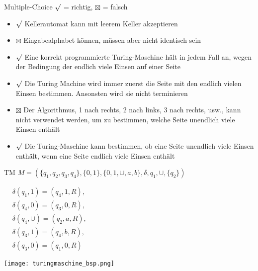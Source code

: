 \begin{example2}{Multiple-Choice} $\surd$ = richtig, $\boxtimes$ = falsch
    \begin{itemize}
        \item $\surd$ Kellerautomat kann mit leerem Keller akzeptieren
        \item $\boxtimes$ Eingabealphabet können, müssen aber nicht identisch sein 
        \item $\surd$ Eine korrekt programmierte Turing-Maschine hält in jedem Fall an, wegen der Bedingung der endlich viele Einsen auf einer Seite
        \item $\surd$ Die Turing Machine wird immer zuerst die Seite mit den endlich vielen Einsen bestimmen. Ansonsten wird sie nicht terminieren
        \item $\boxtimes$ Der Algorithmus, 1 nach rechts, 2 nach links, 3 nach rechts, usw., kann nicht verwendet werden, um zu bestimmen, welche Seite unendlich viele Einsen enthält
        \item $\surd$ Die Turing-Maschine kann bestimmen, ob eine Seite unendlich viele Einsen enthält, wenn eine Seite endlich viele Einsen enthält
    \end{itemize}
\end{example2}


\begin{example2}
    {TM} $M=(\{q_1, q_2, q_3, q_4\},\{0,1\},\{0,1, \cup, a, b\}, \delta, q_1, \cup,\{q_2\})$ 
    
    \begin{minipage}{0.35\linewidth}
    $
    \begin{aligned}
    & \delta(q_1, 1)=(q_4, 1, R), \\
    & \delta(q_4, 0)=(q_3, 0, R), \\
    & \delta(q_4, \cup)=(q_2, a, R), \\
    & \delta(q_3, 1)=(q_4, b, R), \\
    & \delta(q_3, 0)=(q_1, 0, R)
    \end{aligned}
    $
\end{minipage}
\begin{minipage}{0.6\linewidth}
    \texttt{[image: turingmaschine\_bsp.png]}
\end{minipage}
\end{example2}


